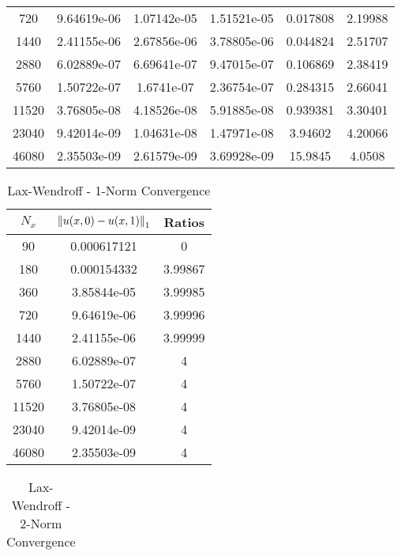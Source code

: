 \documentclass[12pt]{article}
\begin{document}
\begin{enumerate}[(a)]
\begin{table}[H]
\begin{tabular}{||c|ccc|cc||}
   720 &    9.64619e-06 &    1.07142e-05 &      1.51521e-05 &  0.017808 &          2.19988 \\
  1440 &    2.41155e-06 &    2.67856e-06 &      3.78805e-06 &  0.044824 &          2.51707 \\
  2880 &    6.02889e-07 &    6.69641e-07 &      9.47015e-07 &  0.106869 &          2.38419 \\
  5760 &    1.50722e-07 &    1.6741e-07  &      2.36754e-07 &  0.284315 &          2.66041 \\
 11520 &    3.76805e-08 &    4.18526e-08 &      5.91885e-08 &  0.939381 &          3.30401 \\
 23040 &    9.42014e-09 &    1.04631e-08 &      1.47971e-08 &  3.94602  &          4.20066 \\
 46080 &    2.35503e-09 &    2.61579e-09 &      3.69928e-09 & 15.9845   &          4.0508  \\
\hline \hline
\end{tabular}
\end{table}
\begin{minipage}{0.5\textwidth}
\begin{table}[H]
\caption{Lax-Wendroff - 1-Norm Convergence}
\centering\begin{tabular}{||c|cc||}
\hline \hline
    $N_x$ & $\norm{u(x,0)-u(x,1)}_1$ &  Ratios \\
\hline
    90 &    0.000617121 &  0       \\
   180 &    0.000154332 &  3.99867 \\
   360 &    3.85844e-05 &  3.99985 \\
   720 &    9.64619e-06 &  3.99996 \\
  1440 &    2.41155e-06 &  3.99999 \\
  2880 &    6.02889e-07 &  4       \\
  5760 &    1.50722e-07 &  4       \\
 11520 &    3.76805e-08 &  4       \\
 23040 &    9.42014e-09 &  4       \\
 46080 &    2.35503e-09 &  4       \\
\hline \hline
\end{tabular}
\end{table}
\end{minipage}
\begin{minipage}{0.5\textwidth}
\begin{table}[H]
\caption{Lax-Wendroff - 2-Norm Convergence}
\centering\begin{tabular}{||c|cc||}

\end{tabular}
\end{table}
\end{minipage}
\end{enumerate}
\end{document}
